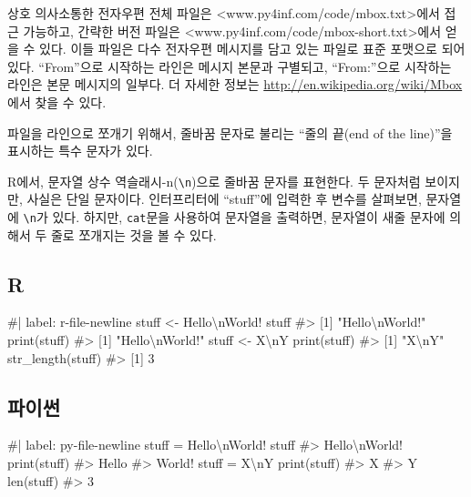 \documentclass[
  letterpaper,
]{book}
\newenvironment{Shaded}{\begin{snugshade}}{\end{snugshade}}
\newcommand{\NormalTok}[1]{\textcolor[rgb]{0.00,0.23,0.31}{#1}}
\begin{document}
상호 의사소통한 전자우편 전체 파일은
\textless www.py4inf.com/code/mbox.txt\textgreater 에서 접근 가능하고,
간략한 버전 파일은
\textless www.py4inf.com/code/mbox-short.txt\textgreater 에서 얻을 수
있다. 이들 파일은 다수 전자우편 메시지를 담고 있는 파일로 표준 포맷으로
되어 있다. ``From''으로 시작하는 라인은 메시지 본문과 구별되고,
``From:''으로 시작하는 라인은 본문 메시지의 일부다. 더 자세한 정보는
\url{http://en.wikipedia.org/wiki/Mbox}에서 찾을 수 있다.

파일을 라인으로 쪼개기 위해서, 줄바꿈 문자로 불리는 ``줄의 끝(end of the
line)''을 표시하는 특수 문자가 있다. 

R에서, 문자열 상수 역슬래시-n(\texttt{\textbackslash{}n})으로 줄바꿈
문자를 표현한다. 두 문자처럼 보이지만, 사실은 단일 문자이다.
인터프리터에 ``stuff''에 입력한 후 변수를 살펴보면, 문자열에
\texttt{\textbackslash{}n}가 있다. 하지만, \texttt{cat}문을 사용하여
문자열을 출력하면, 문자열이 새줄 문자에 의해서 두 줄로 쪼개지는 것을 볼
수 있다.

\subsection{R}

\begin{Shaded}
\begin{Highlighting}[]
\NormalTok{\#| label: r{-}file{-}newline}
\NormalTok{stuff \textless{}{-} \textquotesingle{}Hello\textbackslash{}nWorld!\textquotesingle{}}
\NormalTok{stuff}
\NormalTok{\#\textgreater{} [1] "Hello\textbackslash{}nWorld!"}
\NormalTok{print(stuff)}
\NormalTok{\#\textgreater{} [1] "Hello\textbackslash{}nWorld!"}
\NormalTok{stuff \textless{}{-} \textquotesingle{}X\textbackslash{}nY\textquotesingle{}}
\NormalTok{print(stuff)}
\NormalTok{\#\textgreater{} [1] "X\textbackslash{}nY"}
\NormalTok{str\_length(stuff)}
\NormalTok{\#\textgreater{} [1] 3}
\end{Highlighting}
\end{Shaded}

\subsection{파이썬}

\begin{Shaded}
\begin{Highlighting}[]
\NormalTok{\#| label: py{-}file{-}newline}
\NormalTok{stuff = \textquotesingle{}Hello\textbackslash{}nWorld!\textquotesingle{}}
\NormalTok{stuff}
\NormalTok{\#\textgreater{} \textquotesingle{}Hello\textbackslash{}nWorld!\textquotesingle{}}
\NormalTok{print(stuff)}
\NormalTok{\#\textgreater{} Hello}
\NormalTok{\#\textgreater{} World!}
\NormalTok{stuff = \textquotesingle{}X\textbackslash{}nY\textquotesingle{}}
\NormalTok{print(stuff)}
\NormalTok{\#\textgreater{} X}
\NormalTok{\#\textgreater{} Y}
\NormalTok{len(stuff)}
\NormalTok{\#\textgreater{} 3}
\end{Highlighting}
\end{Shaded}
\end{document}
